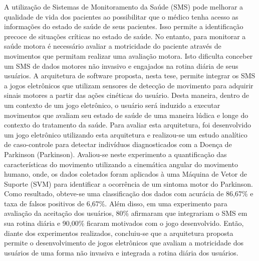 A utilização de Sistemas de Monitoramento da Saúde (SMS) pode melhorar a qualidade de vida dos pacientes ao possibilitar que o médico tenha acesso as informações do estado de saúde de seus pacientes. Isso permite a identificação precoce de situações críticas no estado de saúde.
No entanto, para monitorar a saúde motora é necessário avaliar a motricidade do paciente através de movimentos que permitam realizar uma avaliação motora.  Isto dificulta conceber um SMS de dados motores não invasivo e engajados na rotina diária de seus usuários. A arquitetura de software proposta, nesta tese, permite integrar os SMS a jogos eletrônicos que utilizam sensores de detecção de movimento para adquirir sinais motores a partir das ações cinéticas do usuário. Desta maneira, dentro de um contexto de um jogo eletrônico, o usuário será induzido a executar movimentos que avaliam seu estado de saúde de uma maneira lúdica e longe do contexto do tratamento da saúde. Para avaliar esta arquitetura, foi desenvolvido um jogo eletrônico utilizando esta arquitetura e realizou-se um estudo analítico de caso-controle para detectar indivíduos diagnosticados com a Doença de Parkinson (Parkinson). Avaliou-se neste experimento a quantificação das características do movimento utilizando a cinemática angular do movimento humano, onde, os dados coletados foram aplicados à uma Máquina de Vetor de Suporte (SVM) para identificar a ocorrência de um sintoma motor do Parkinson. Como resultado, obteve-se uma classificação dos dados com acurácia de 86,67\% e taxa de falsos positivos de 6,67\%. Além disso, em uma experimento para avaliação da aceitação dos usuários, 80\% afirmaram que integrariam o SMS em sua rotina diária e 90,00\% ficaram motivados com o jogo desenvolvido. Então, diante dos experimentos realizados, concluiu-se que a arquitetura proposta permite o desenvolvimento de jogos eletrônicos que avaliam a motricidade dos usuários de uma forma não invasiva e integrada a rotina diária dos usuários.



